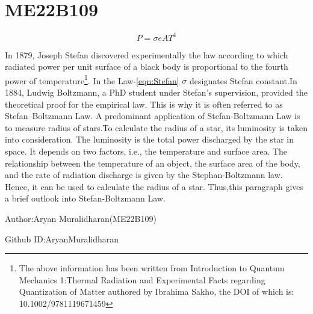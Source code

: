 \documentclass[a4paper,12pt]{article}
\begin{document}
\section{ME22B109}

\begin{equation}
    P = \sigma eAT^4
    \label{eqn:Stefan}
\end{equation}

In 1879, Joseph Stefan discovered experimentally the law according to which radiated power per unit surface of a black body is proportional to the fourth power of temperature\footnote{The above information has been written from Introduction to Quantum Mechanics 1:Thermal Radiation and Experimental Facts regarding Quantization of Matter authored by Ibrahima Sakho, the DOI of which is: 10.1002/9781119671459}. 
In the Law-\ref{eqn:Stefan} $ \sigma $ designates Stefan constant.In 1884, Ludwig Boltzmann, a PhD student under Stefan’s  supervision, provided the theoretical proof for the empirical law.  This is why it is often referred to as Stefan–Boltzmann Law.
A predominant application of Stefan-Boltzmann Law is to measure radius of stars.To calculate the radius of a star, its luminosity is taken into consideration. The luminosity is the total power discharged by the star in space. It depends on two factors, i.e., the temperature and surface area. The relationship between the temperature of an object, the surface area of the body, and the rate of radiation discharge is given by the Stephan-Boltzmann law. Hence, it can be used to calculate the radius of a star.
Thus,this paragraph gives a brief outlook into Stefan-Boltzmann Law.

Author:Aryan Muralidharan(ME22B109)

Github ID:AryanMuralidharan
\end{document}
